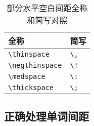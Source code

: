 \begin{table}[h]
    \centering
    \begin{tabular}{ll}
        \toprule
        全称 & 简写 \\
        \midrule
        \verb|\thinspace| & \verb|\,| \\
        \verb|\negthinspace| & \verb|\!| \\
        \verb|\medspace| & \verb|\:|  \\
        \verb|\thickspace| & \verb|\;|\\
        \bottomrule
    \end{tabular}
    \caption{部分水平空白间距全称和简写对照}
\end{table}

\subsection{正确处理单词间距}

